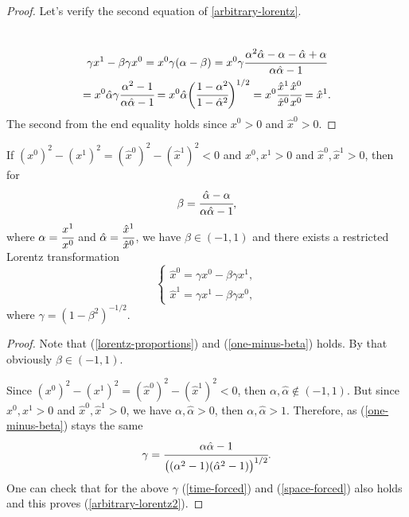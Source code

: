 \documentclass[main.tex]{subfiles}
\begin{document}
\begin{proof}
Let's verify the second equation of \ref{arbitrary-lorentz}.

\begin{multline}\\
\label{space-forced}
\gamma x^1 - \beta \gamma x^0 = x^0\gamma(\alpha - \beta) 
= x^0\gamma\cfrac{\alpha^2\hat{\alpha} - \alpha - \hat{\alpha} + \alpha}{\alpha\hat{\alpha} - 1} 
\\ = x^0 \hat{\alpha}\gamma \cfrac{\alpha^2 - 1}{\alpha\hat{\alpha} - 1} = x^0 \hat{\alpha}\bigg(\cfrac{1 - \alpha^2}{1 - \hat{\alpha}^2}\bigg)^{1/2} = x^0 \cfrac{\hat{x}^1}{\hat{x}^0} \cfrac{\hat{x}^0}{x^0} = \hat{x}^1.
\\
\end{multline}
The second from the end equality holds since $x^0 > 0$ and $\hat{x}^0 > 0$.
\end{proof}

\begin{lemma}
\label{any-space-like}
If $(x^0)^2 - (x^1)^2 = (\hat{x}^0)^2 - (\hat{x}^1)^2 < 0$ and $x^0, x^1 > 0$ and $\hat{x}^0, \hat{x}^1 > 0$, then for 
\begin{equation}
\beta = \cfrac{\hat{\alpha} - \alpha}{\alpha \hat{\alpha} - 1},
\end{equation}
where $\alpha = \cfrac{x^1}{x^0}$ and $\hat{\alpha} = \cfrac{\hat{x}^1}{\hat{x}^0}$,
we have $\beta\in (-1, 1)$ and there exists a restricted Lorentz transformation
\begin{equation}
\label{arbitrary-lorentz2}
\begin{cases}
    \hat{x}^0 = \gamma x^0 - \beta \gamma x^1, \\
    \hat{x}^1 = \gamma x^1 -\beta \gamma x^0,
\end{cases}
\end{equation} 
where $\gamma = (1 - \beta^2)^{-1/2}$.
\end{lemma}
\begin{proof}
Note that (\ref{lorentz-proportions}) and (\ref{one-minus-beta}) holds. By that obviously $\beta\in(-1, 1)$.

Since $(x^0)^2 - (x^1)^2  = (\hat{x}^0)^2 - (\hat{x}^1)^2 < 0$, then $\alpha, \hat{\alpha} \not\in (-1, 1)$. But since $x^0, x^1 > 0$ and $\hat{x}^0, \hat{x}^1 > 0$, we have $\alpha, \hat{\alpha} > 0$, then $\alpha, \hat{\alpha} > 1$.
Therefore, as (\ref{one-minus-beta}) stays the same
\begin{equation}
\gamma = \cfrac{\alpha\hat{\alpha} - 1}{\big((\alpha^2 - 1)(\hat{\alpha}^2 - 1)\big)^{1/2}}.
\end{equation}
One can check that for the above $\gamma$ (\ref{time-forced}) and (\ref{space-forced}) also holds and this proves (\ref{arbitrary-lorentz2}).
\end{proof}
\end{document}
